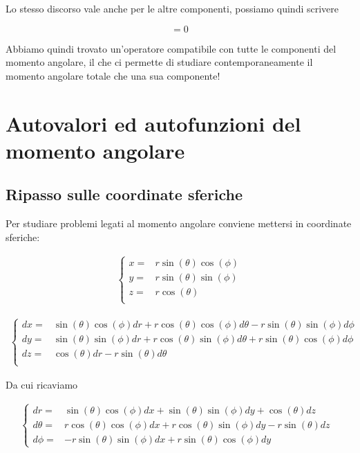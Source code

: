 Lo stesso discorso vale anche per le altre componenti, possiamo quindi scrivere

\begin{equation}
[\mathbf{L_i}, \mathbf{L^2}] = 0
\end{equation}

Abbiamo quindi trovato un'operatore compatibile con tutte le componenti del momento angolare, il che ci permette di studiare contemporaneamente il momento angolare totale che una sua componente!

\newpage

\section{Autovalori ed autofunzioni del momento angolare}

\subsection{Ripasso sulle coordinate sferiche}

Per studiare problemi legati al momento angolare conviene mettersi in coordinate sferiche:


\begin{align}
\left\{\begin{array}{ccc}
x={}& r\sin(\theta)\cos(\phi) \\ 
y= &  r\sin(\theta)\sin(\phi) \\
z= &  r\cos(\theta) \qquad \;\:  \\
\end{array}\right. 
\end{align}

\begin{align}
\left\{\begin{array}{ccc}
dx={}& \sin(\theta)\cos(\phi)dr + r\cos(\theta)\cos(\phi) d\theta - r \sin(\theta)\sin(\phi) d\phi \\ 
dy= &  \sin(\theta)\sin(\phi)dr + r \cos(\theta)\sin(\phi)d\theta + r\sin(\theta)\cos(\phi) d \phi\\
dz= &  \cos(\theta) dr - r\sin(\theta) d\theta \qquad \qquad \qquad\qquad\qquad\qquad\qquad \\
\end{array}\right. 
\end{align}

Da cui ricaviamo

\begin{align}
\left\{\begin{array}{ccc}
dr={}& \sin(\theta)\cos(\phi)dx + \sin(\theta)\sin(\phi) dy + \cos(\theta)dz \qquad \\
d\theta =& r\cos(\theta)\cos(\phi)dx + r\cos(\theta)\sin(\phi)dy - r\sin(\theta) dz\\
d\phi =& -r \sin(\theta)\sin(\phi) dx +  r \sin(\theta)\cos(\phi) dy \qquad \qquad \quad \:
\end{array}\right. 
\end{align}

